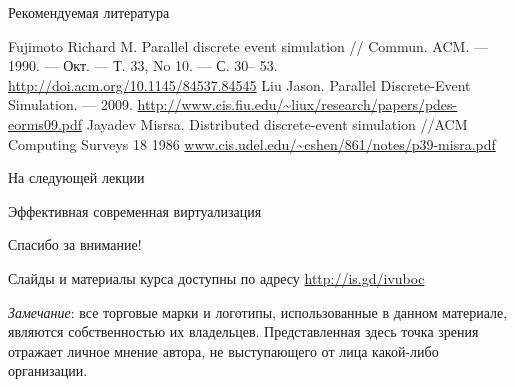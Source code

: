 \documentclass{beamer}
\begin{document}
\begin{frame}[allowframebreaks]{Рекомендуемая литература}
\begin{thebibliography}{99}
 Fujimoto Richard M. Parallel discrete event simulation // Commun. ACM. — 1990. — Окт. — Т. 33, No 10. — С. 30– 53. \url{http://doi.acm.org/10.1145/84537.84545}
 Liu Jason. Parallel Discrete-Event Simulation. — 2009. \url{http://www.cis.fiu.edu/~liux/research/papers/pdes-eorms09.pdf}
Jayadev Misrsa. Distributed discrete-event simulation //ACM Computing Surveys 18 1986 \url{www.cis.udel.edu/~cshen/861/notes/p39-misra.pdf}


\end{thebibliography}
\end{frame}


\begin{frame}{На следующей лекции}
\centering

Эффективная современная виртуализация

\end{frame}


\begin{frame}

{\huge{Спасибо за внимание!}\par}

\vfill

Слайды и материалы курса доступны по адресу \url{http://is.gd/ivuboc} %

\vfill

\tiny{\textit{Замечание}: все торговые марки и логотипы, использованные в данном материале, являются собственностью их владельцев. Представленная здесь точка зрения отражает личное мнение автора, не выступающего от лица какой-либо организации.}

\end{frame}
\end{document}
